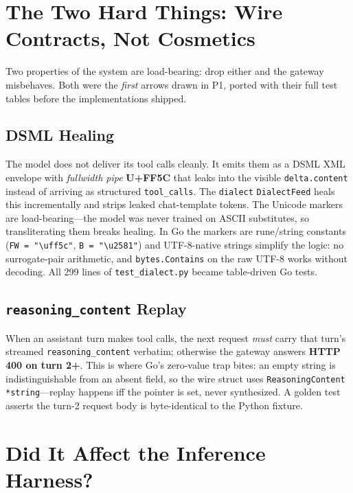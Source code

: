 \documentclass[11pt,a4paper]{article}
\newcommand{\py}[1]{\textcolor{pyblue}{\texttt{#1}}}
\begin{document}
\section{The Two Hard Things: Wire Contracts, Not Cosmetics}

\noindent
Two properties of the system are load-bearing: drop either and the gateway misbehaves. Both were the \emph{first} arrows drawn in P1, ported with their full test tables before the implementations shipped.

\subsection{DSML Healing}
\noindent
The model does not deliver its tool calls cleanly. It emits them as a DSML XML envelope with \emph{fullwidth pipe} \textbf{U+FF5C} that leaks into the visible \texttt{delta.content} instead of arriving as structured \texttt{tool\_calls}. The \py{dialect} \texttt{DialectFeed} heals this incrementally and strips leaked chat-template tokens. The Unicode markers are load-bearing---the model was never trained on ASCII substitutes, so transliterating them breaks healing. In Go the markers are rune/string constants (\texttt{FW = "\textbackslash{}uff5c"}, \texttt{B = "\textbackslash{}u2581"}) and UTF-8-native strings simplify the logic: no surrogate-pair arithmetic, and \texttt{bytes.Contains} on the raw UTF-8 works without decoding. All 299 lines of \texttt{test\_dialect.py} became table-driven Go tests.

\subsection{\texttt{reasoning\_content} Replay}
\noindent
When an assistant turn makes tool calls, the next request \emph{must} carry that turn's streamed \texttt{reasoning\_content} verbatim; otherwise the gateway answers \textbf{HTTP 400 on turn 2+}. This is where Go's zero-value trap bites: an empty string is indistinguishable from an absent field, so the wire struct uses \texttt{ReasoningContent *string}---replay happens iff the pointer is set, never synthesized. A golden test asserts the turn-2 request body is byte-identical to the Python fixture.

\section{Did It Affect the Inference Harness?}
\end{document}
